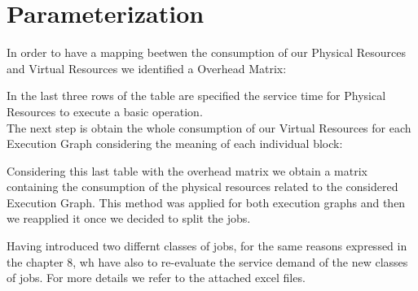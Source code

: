 \chapter{\textbf{Parameterization}}

In order to have a mapping beetwen the consumption of our Physical Resources and Virtual Resources we identified a Overhead Matrix:

\begin{center}
\end{center}
\bigskip

In the last three rows of the table are specified the service time for Physical Resources to execute a basic operation.\\
The next step is obtain the whole consumption of our Virtual Resources for each Execution Graph considering the meaning of each individual block:

\begin{center}
\end{center}


\begin{center}
\end{center}
\bigskip

Considering this last table with the overhead matrix we obtain a matrix containing the consumption of the physical resources related to the considered Execution Graph. This method was applied for both execution graphs and then we reapplied it once we decided to split the jobs.

\begin{center}
\end{center}

Having introduced two differnt classes of jobs, for the same reasons expressed in the chapter 8, wh have also to re-evaluate the service demand of the new classes of jobs. 
For more details we refer to the attached excel files.

